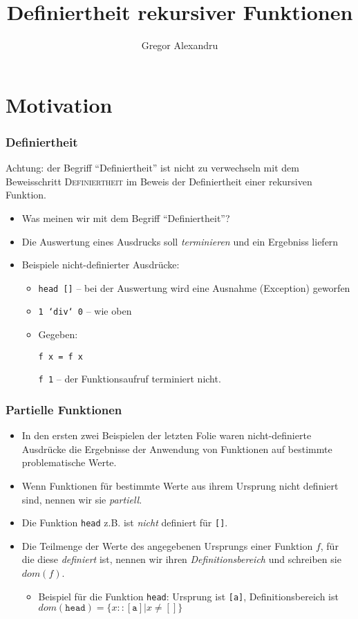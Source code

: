 \documentclass{beamer}
\title{Definiertheit rekursiver Funktionen}
\author{Gregor Alexandru}
\begin{document}
\begin{frame}
 \titlepage
\end{frame}

\section{Motivation}

\begin{frame}[fragile]
  \frametitle{Definiertheit}
  Achtung: der Begriff \enquote{Definiertheit} ist nicht zu verwechseln mit dem Beweisschritt \textsc{Definiertheit} im Beweis der Definiertheit einer rekursiven Funktion.
  \begin{itemize}
  \item Was meinen wir mit dem Begriff \enquote{Definiertheit}?
  \item Die Auswertung eines Ausdrucks soll \emph{terminieren} und ein Ergebniss liefern
  \item Beispiele nicht-definierter Ausdrücke:
    \begin{itemize}
    \item \texttt{head []} -- bei der Auswertung wird eine Ausnahme (Exception) geworfen
    \item \texttt{1 `div` 0} -- wie oben
    \item Gegeben:
\begin{Verbatim}
f x = f x
\end{Verbatim}
      \texttt{f 1} -- der Funktionsaufruf terminiert nicht.
    \end{itemize}
  \end{itemize}
\end{frame}
\begin{frame}
  \frametitle{Partielle Funktionen}
  \begin{itemize}
  \item In den ersten zwei Beispielen der letzten Folie waren nicht-definierte Ausdrücke die Ergebnisse der Anwendung von Funktionen auf bestimmte problematische Werte.
  \item Wenn Funktionen für bestimmte Werte aus ihrem Ursprung nicht definiert sind, nennen wir sie \emph{partiell}.
  \item Die Funktion \texttt{head} z.B. ist \emph{nicht} definiert für \texttt{[]}.
  \item Die Teilmenge der Werte des angegebenen Ursprungs einer Funktion \(f\), für die diese \emph{definiert} ist, nennen wir ihren \emph{Definitionsbereich} und schreiben sie \(dom(f)\).
    \begin{itemize}
    \item Beispiel für die Funktion \texttt{head}: Ursprung ist \texttt{[a]}, Definitionsbereich ist \(dom(\mathtt{head})=\{x\mathtt{::[a]}|x\neq\mathtt{[]}\}\)
    \end{itemize}
  \end{itemize}
\end{frame}
\end{document}
